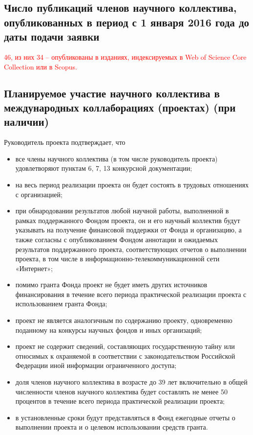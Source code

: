 \documentclass[12pt]{article}  %
\theoremstyle{remark}
\newcommand{\checkme}[1]{\textcolor{red}{#1}}
\begin{document}
\subsection{Число публикаций членов научного коллектива, опубликованных в период с 1 января 2016 года до даты подачи заявки}

\checkme{46, из них 34 – опубликованы в изданиях, индексируемых в Web of Science Core Collection или в Scopus.}

\subsection{Планируемое участие научного коллектива в международных коллаборациях (проектах) (при наличии)}

\vline
Руководитель проекта подтверждает, что
\begin{itemize}
\item все члены научного коллектива (в том числе руководитель проекта) удовлетворяют пунктам 6, 7, 13 конкурсной документации;
\item на весь период реализации проекта он будет состоять в трудовых отношениях с организацией;
\item при обнародовании результатов любой научной работы, выполненной в рамках поддержанного Фондом проекта, он и его научный коллектив будут указывать на получение финансовой поддержки от Фонда и организацию, а также согласны с опубликованием Фондом аннотации и ожидаемых результатов поддержанного проекта, соответствующих отчетов о выполнении проекта, в том числе в информационно-телекоммуникационной сети «Интернет»;
\item помимо гранта Фонда проект не будет иметь других источников финансирования в течение всего периода практической реализации проекта с использованием гранта Фонда;
\item проект не является аналогичным по содержанию проекту, одновременно поданному на конкурсы научных фондов и иных организаций;
\item проект не содержит сведений, составляющих государственную тайну или относимых к охраняемой в соответствии с законодательством Российской Федерации иной информации ограниченного доступа;
\item доля членов научного коллектива в возрасте до 39 лет включительно в общей численности членов научного коллектива будет составлять не менее 50 процентов в течение всего периода практической реализации проекта;
\item в установленные сроки будут представляться в Фонд ежегодные отчеты о выполнении проекта и о целевом использовании средств гранта.
\end{itemize}
\end{document}

